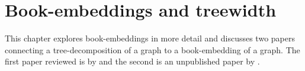 \chapter{Book-embeddings and treewidth}\label{chap:book-embeddings}

This chapter explores book-embeddings in more detail and discusses two papers connecting a tree-decomposition of a graph to a book-embedding of a graph. The first paper reviewed is by \textcite{ganleyPagenumberTrees2001} and the second is an unpublished paper by \textcite{hickingbothamStackNumberCliqueSum2023}. 












